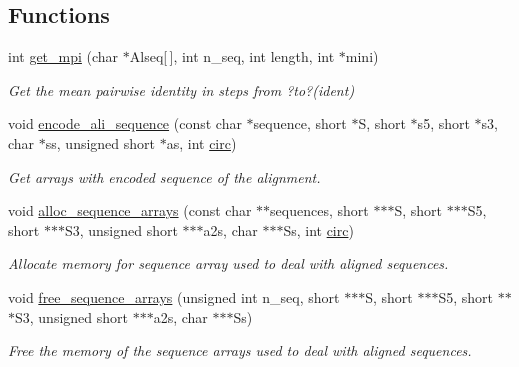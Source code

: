 \subsection*{Functions}
\begin{DoxyCompactItemize}
\item 
int \mbox{\hyperlink{group__aln__utils__deprecated_gaa2d600be90844094ec145ea14a314d2f}{get\+\_\+mpi}} (char $\ast$Alseq\mbox{[}$\,$\mbox{]}, int n\+\_\+seq, int length, int $\ast$mini)
\begin{DoxyCompactList}\small\item\em Get the mean pairwise identity in steps from ?to?(ident) \end{DoxyCompactList}\item 
void \mbox{\hyperlink{group__aln__utils__deprecated_gaa3e40277c837d6f7603afe319884c786}{encode\+\_\+ali\+\_\+sequence}} (const char $\ast$sequence, short $\ast$S, short $\ast$s5, short $\ast$s3, char $\ast$ss, unsigned short $\ast$as, int \mbox{\hyperlink{group__model__details_gaf9202a1a09f5828dc731e2d9a10fa111}{circ}})
\begin{DoxyCompactList}\small\item\em Get arrays with encoded sequence of the alignment. \end{DoxyCompactList}\item 
void \mbox{\hyperlink{group__aln__utils__deprecated_ga8a560930f7f2582cc3967723a86cfdfa}{alloc\+\_\+sequence\+\_\+arrays}} (const char $\ast$$\ast$sequences, short $\ast$$\ast$$\ast$S, short $\ast$$\ast$$\ast$S5, short $\ast$$\ast$$\ast$S3, unsigned short $\ast$$\ast$$\ast$a2s, char $\ast$$\ast$$\ast$Ss, int \mbox{\hyperlink{group__model__details_gaf9202a1a09f5828dc731e2d9a10fa111}{circ}})
\begin{DoxyCompactList}\small\item\em Allocate memory for sequence array used to deal with aligned sequences. \end{DoxyCompactList}\item 
void \mbox{\hyperlink{group__aln__utils__deprecated_ga298a420a8c879202e2617b3f724fde38}{free\+\_\+sequence\+\_\+arrays}} (unsigned int n\+\_\+seq, short $\ast$$\ast$$\ast$S, short $\ast$$\ast$$\ast$S5, short $\ast$$\ast$$\ast$S3, unsigned short $\ast$$\ast$$\ast$a2s, char $\ast$$\ast$$\ast$Ss)
\begin{DoxyCompactList}\small\item\em Free the memory of the sequence arrays used to deal with aligned sequences. \end{DoxyCompactList}\end{DoxyCompactItemize}


